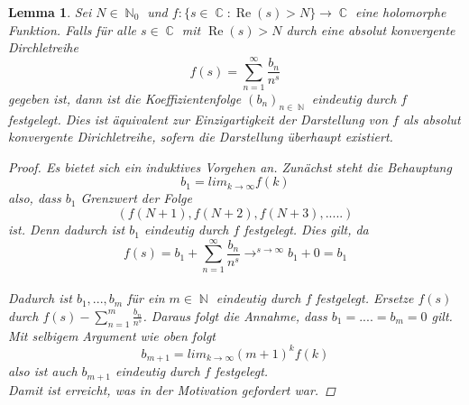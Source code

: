\documentclass[10pt,a4paper]{article}
\theoremstyle{plain}
\newtheorem{lem}[thm]{Lemma}
\theoremstyle{definition}
\theoremstyle{remark}
\DeclareMathOperator{\C}{\mathbb{C}}
\DeclareMathOperator{\N}{\mathbb{N}}
\DeclareMathOperator{\re}{Re}
\begin{document}
 \begin{lem}
 
Sei $N \in \N_0$ und $f \colon \{s \in \C \colon \re(s)>N\}\rightarrow \C$ eine holomorphe Funktion. Falls für alle $s \in \C$ mit $ \re(s) >N$ durch eine absolut konvergente Dirchletreihe $$f(s) = \sum_{n=1}^{\infty}\frac{b_n}{n^s}$$gegeben ist, dann ist die Koeffizientenfolge $(b_n)_{n \in \N}$ eindeutig durch $f$ festgelegt. Dies ist äquivalent zur Einzigartigkeit der Darstellung von $f$ als absolut konvergente Dirichletreihe, sofern die Darstellung überhaupt existiert.
 \\
\begin{proof}
 Es bietet sich ein induktives Vorgehen an.
Zunächst steht die Behauptung $$b_1= lim_{k \to \infty} f(k)$$also, dass $b_1$ Grenzwert der Folge $$(f(N+1),f(N+2),f(N+3),.....)$$ ist. Denn dadurch ist $b_1$ eindeutig durch $f$ festgelegt. Dies gilt, da $$f(s)=b_1+\sum_{n=1}^{\infty} \frac{b_n}{n^s}\rightarrow^{s \to \infty} b_1 + 0 = b_1$$
\\ 
Dadurch ist $b_1,...,b_m$ für ein $m \in \N$ eindeutig durch $f$ festgelegt. Ersetze $f(s)$ durch $f(s)-\sum_{n=1}^{m}\frac{b_n}{n^s}$. Daraus folgt die Annahme, dass $b_1=....=b_m=0$ gilt. Mit selbigem Argument wie oben folgt $$b_{m+1}=lim_{k\to \infty}(m+1)^k f(k)$$ also ist auch $b_{m+1}$ eindeutig durch $f$ festgelegt.
\\
Damit ist erreicht, was in der Motivation gefordert war.

\end{proof}


\end{lem}
\end{document}
